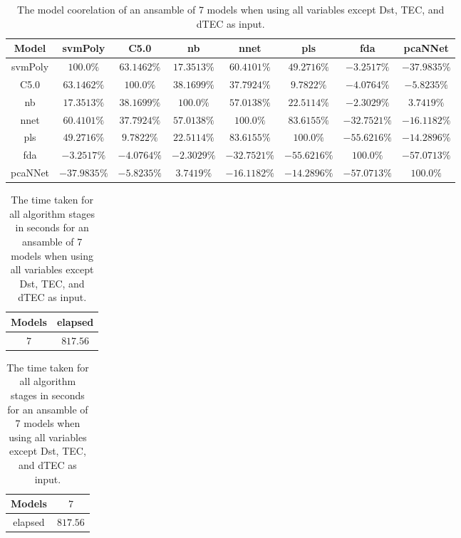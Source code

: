 \begin{table}[!ht]
	\centering
	\begin{tabular}{|c|c|c|c|c|c|c|c|}
		\hline
		Model & svmPoly & C5.0 & nb & nnet & pls & fda & pcaNNet \\ \hline
		svmPoly & $100.0\%$ & $63.1462\%$ & $17.3513\%$ & $60.4101\%$ & $49.2716\%$ & $-3.2517\%$ & $-37.9835\%$ \\ \hline
		C5.0 & $63.1462\%$ & $100.0\%$ & $38.1699\%$ & $37.7924\%$ & $9.7822\%$ & $-4.0764\%$ & $-5.8235\%$ \\ \hline
		nb & $17.3513\%$ & $38.1699\%$ & $100.0\%$ & $57.0138\%$ & $22.5114\%$ & $-2.3029\%$ & $3.7419\%$ \\ \hline
		nnet & $60.4101\%$ & $37.7924\%$ & $57.0138\%$ & $100.0\%$ & $83.6155\%$ & $-32.7521\%$ & $-16.1182\%$ \\ \hline
		pls & $49.2716\%$ & $9.7822\%$ & $22.5114\%$ & $83.6155\%$ & $100.0\%$ & $-55.6216\%$ & $-14.2896\%$ \\ \hline
		fda & $-3.2517\%$ & $-4.0764\%$ & $-2.3029\%$ & $-32.7521\%$ & $-55.6216\%$ & $100.0\%$ & $-57.0713\%$ \\ \hline
		pcaNNet & $-37.9835\%$ & $-5.8235\%$ & $3.7419\%$ & $-16.1182\%$ & $-14.2896\%$ & $-57.0713\%$ & $100.0\%$ \\ \hline
	\end{tabular}
	\caption{The model coorelation of an ansamble of 7 models when using all variables except Dst, TEC, and dTEC as input.}
	\label{tab:ansamble7:noTEC}
\end{table}

\begin{table}[!ht]
	\centering
	\begin{tabular}{|c|c|}
		\hline
		Models & elapsed \\ \hline
		$7$ & $817.56$ \\ \hline
	\end{tabular}
	\caption{The time taken for all algorithm stages in seconds for an ansamble of 7 models when using all variables except Dst, TEC, and dTEC as input.}
	\label{tab:time:ansamble:noTEC:7}
\end{table}

\begin{table}[!ht]
	\centering
	\begin{tabular}{|c|c|}
		\hline
		Models & $7$ \\ \hline
		elapsed & $817.56$ \\ \hline
	\end{tabular}
	\caption{The time taken for all algorithm stages in seconds for an ansamble of 7 models when using all variables except Dst, TEC, and dTEC as input.}
	\label{tab:time:ansamble:reverse:noTEC:7}
\end{table}


